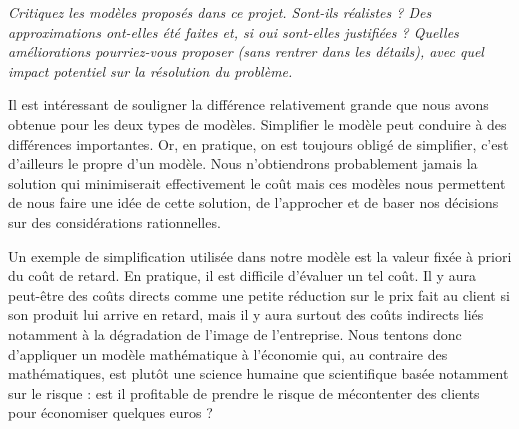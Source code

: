 \question %
\emph{Critiquez les modèles proposés dans ce projet. Sont-ils réalistes ?
Des approximations ont-elles été faites et, si oui sont-elles justifiées ?
Quelles améliorations pourriez-vous proposer (sans rentrer dans les détails),
avec quel impact potentiel sur la résolution du problème.}


Il est intéressant de souligner la différence relativement grande que nous avons obtenue pour les deux types de modèles. Simplifier le modèle peut conduire à des différences importantes. Or, en pratique, on est toujours obligé de simplifier, c'est d'ailleurs le propre d'un modèle. Nous n'obtiendrons probablement jamais la solution qui minimiserait effectivement le coût mais ces modèles nous permettent de nous faire une idée de cette solution, de l'approcher et de baser nos décisions sur des considérations rationnelles. 

Un exemple de simplification utilisée dans notre modèle est la valeur fixée à priori du coût de retard. En pratique, il est difficile d'évaluer un tel coût. Il y aura peut-être des coûts directs comme une petite réduction sur le prix fait au client si son produit lui arrive en retard, mais il y aura surtout des coûts indirects liés notamment à la dégradation de l'image de l'entreprise. Nous tentons donc d'appliquer un modèle mathématique à l'économie qui, au contraire des mathématiques, est plutôt une science humaine que scientifique basée notamment sur le risque : est il profitable de prendre le risque de mécontenter des clients pour économiser quelques euros ?